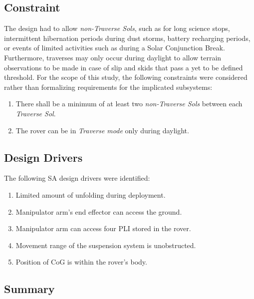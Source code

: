 \subsection{Constraint}
\label{sec:Design:RequirementsAndDesignDrivers:Constraints}
The design had to allow \textit{non-Traverse Sols}, such as for long science stops, intermittent hibernation periods during dust storms, battery recharging periods, or events of limited activities such as during a Solar Conjunction Break. Furthermore, traverses may only occur during daylight to allow terrain observations to be made in case of slip and skids that pass a yet to be defined threshold. For the scope of this study, the following constraints were considered rather than formalizing requirements for the implicated subsystems:

\begin{enumerate}[label=\textbf{\textcolor{BulletBlue}{C-\arabic*}}]
    \item There shall be a minimum of at least two \textit{non-Traverse Sols} between each \textit{Traverse Sol}.
    \item The rover can be in \textit{Traverse mode} only during daylight.
\end{enumerate}

\subsection{Design Drivers}
\label{sec:Design:RequirementsAndDesignDrivers:DesignDrivers}
The following \ac{SA} design drivers were identified:

\begin{enumerate}[label=\textbf{\textcolor{BulletBlue}{D-\arabic*}}]
    \item Limited amount of unfolding during deployment.
    \item Manipulator arm's end effector can access the ground.
    \item Manipulator arm can access four \ac{PLI} stored in the rover.
    \item Movement range of the suspension system is unobstructed.
    \item Position of \ac{CoG} is within the rover's body.
\end{enumerate}

\subsection{Summary}
\label{sec:Design:RequirementsAndDesignDrivers:Summary}
